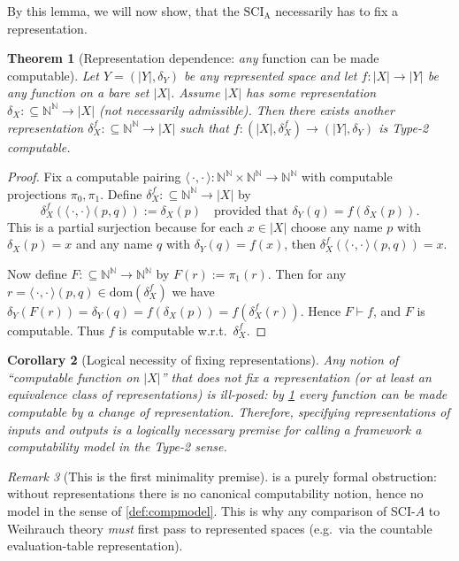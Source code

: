 \documentclass{lmcs} %
\theoremstyle{plain}
\theoremstyle{plain}
\newtheorem{theorem}{Theorem}[section]
\newtheorem{corollary}[theorem]{Corollary}
\theoremstyle{definition}
\theoremstyle{remark}
\newtheorem{remark}[theorem]{Remark}
\theoremstyle{definition}
\theoremstyle{remark}
\numberwithin{equation}{section}
\newcommand{\N}{\mathbb{N}}
\newcommand{\Baire}{\N^\N}
\newcommand{\dom}{\mathrm{dom}}
\newcommand{\pair}{\langle\,\cdot,\cdot\,\rangle}
\begin{document}
By this lemma, we will now show, that the $\mathrm{SCI}_{\mathrm A}$ necessarily has to fix a representation.
\begin{theorem}[Representation dependence: \textit{any} function can be made computable]\label{thm:any-f-computable-by-rep}
Let $Y=(|Y|,\delta_Y)$ be any represented space and let $f:|X|\to |Y|$ be any function on a bare set $|X|$.
Assume $|X|$ has \textit{some} representation $\delta_X:\subseteq\Baire\to |X|$ (not necessarily admissible).
Then there exists another representation $\delta_X^f:\subseteq\Baire\to |X|$ such that $f:(|X|,\delta_X^f)\to(|Y|,\delta_Y)$ is Type-2 computable.
\end{theorem}
\begin{proof}
Fix a computable pairing $\pair:\Baire\times\Baire\to\Baire$ with computable projections $\pi_0,\pi_1$.
Define $\delta_X^f:\subseteq\Baire\to |X|$ by
\[
\delta_X^f(\pair(p,q)) := \delta_X(p)
\quad\text{provided that }\delta_Y(q)= f(\delta_X(p)).
\]
This is a partial surjection because for each $x\in|X|$ choose any name $p$ with $\delta_X(p)=x$
and any name $q$ with $\delta_Y(q)=f(x)$, then $\delta_X^f(\pair(p,q))=x$.

Now define $F:\subseteq\Baire\to\Baire$ by $F(r):=\pi_1(r)$.
Then for any $r=\pair(p,q)\in\dom(\delta_X^f)$ we have $\delta_Y(F(r))=\delta_Y(q)=f(\delta_X(p))=f(\delta_X^f(r))$.
Hence $F\vdash f$, and $F$ is computable. Thus $f$ is computable w.r.t.\ $\delta_X^f$.
\end{proof}

\begin{corollary}[Logical necessity of fixing representations]\label{cor:need-representations}
Any notion of \enquote{computable function on $|X|$} that does \textit{not} fix a representation (or at least an equivalence
class of representations) is ill-posed: by \cref{thm:any-f-computable-by-rep} \textit{every} function can be made
computable by a change of representation.
Therefore, specifying representations of inputs and outputs is a logically necessary premise for calling a framework a computability model in the Type-2 sense.
\end{corollary}

\begin{remark}[This is the first minimality premise]
 is a purely formal obstruction: without representations there is no canonical
computability notion, hence no model in the sense of \cref{def:compmodel}.
This is why any comparison of SCI-$A$ to Weihrauch theory \textit{must} first pass to represented spaces
(e.g.\ via the countable evaluation-table representation).
\end{remark}
\end{document}

